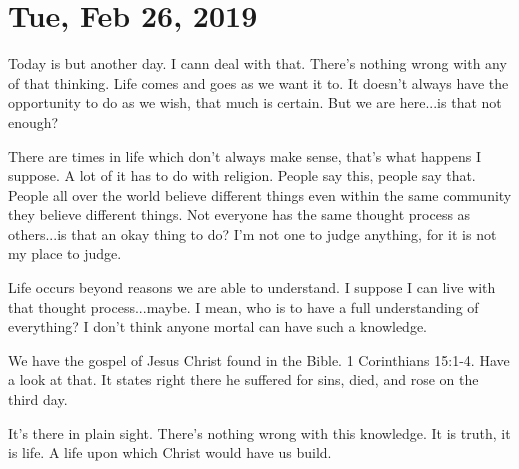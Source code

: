 \section{Tue, Feb 26, 2019}

Today is but another day. I cann deal with that. There's nothing
wrong with any of that thinking. Life comes and goes as we want
it to. It doesn't always have the opportunity to do as we wish,
that much is certain. But we are here...is that not enough?

There are times in life which don't always make sense, that's what
happens I suppose. A lot of it has to do with religion. People say this,
people say that. People all over the world believe different things even
within the same community they believe different things. Not everyone has
the same thought process as others...is that an okay thing to do? I'm
not one to judge anything, for it is not my place to judge.

Life occurs beyond reasons we are able to understand. I suppose I can
live with that thought process...maybe. I mean, who is to have a full
understanding of everything? I don't think anyone mortal can have such
a knowledge.

We have the gospel of Jesus Christ found in the Bible. 1 Corinthians 15:1-4.
Have a look at that. It states right there he suffered for sins, died, and 
rose on the third day.

It's there in plain sight. There's nothing wrong with this knowledge. It
is truth, it is life. A life upon which Christ would have us build.
